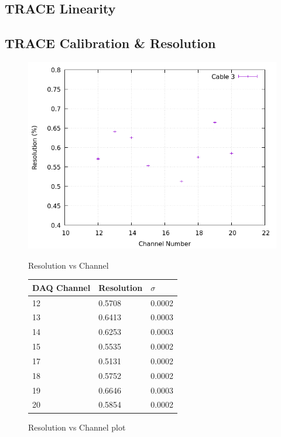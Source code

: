 \subsection{TRACE Linearity}
 
\subsection{TRACE Calibration \& Resolution}

\begin{figure}[h]
  \centering
  \begin{minipage}[b]{0.45\textwidth}
    \includegraphics[width=\textwidth]{img/plot/am/3_res_am.png}
    \caption{Resolution vs Channel}
    \label{res:am3}
  \end{minipage}
  \hfill
  \begin{minipage}[b]{0.45\textwidth}
  \begin{tabular}{lll}
    DAQ Channel & Resolution & $\sigma$ \\
    \midrule
    12 & \num{0.5708} & 0.0002 \\
    13 & \num{0.6413} & 0.0003 \\
    14 & \num{0.6253} & 0.0003 \\
    15 & \num{0.5535} & 0.0002 \\
    17 & \num{0.5131} & 0.0002 \\
    18 & \num{0.5752} & 0.0002 \\
    19 & \num{0.6646} & 0.0003 \\
    20 & \num{0.5854} & 0.0002 \\
    \bottomrule
  \end{tabular}
  \caption{Resolution vs Channel plot}
  \label{res:plot:am3}
  \end{minipage}
\end{figure}

